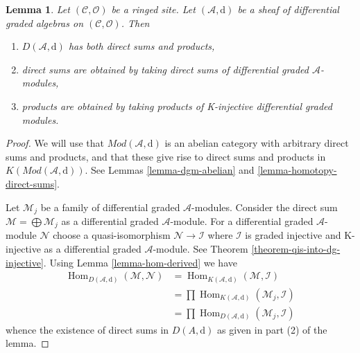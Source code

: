 \documentclass{stacks-project}
\theoremstyle{plain}
\newtheorem{lemma}[subsection]{Lemma}
\theoremstyle{definition}
\theoremstyle{remark}
\numberwithin{equation}{subsection}
\def\Hom{\mathop{\mathrm{Hom}}\nolimits}
\begin{document}
\begin{lemma}
\label{lemma-derived-products}
Let $(\mathcal{C}, \mathcal{O})$ be a ringed site. Let
$(\mathcal{A}, \text{d})$ be a sheaf of differential graded algebras
on $(\mathcal{C}, \mathcal{O})$. Then
\begin{enumerate}
\item $D(\mathcal{A}, \text{d})$ has both direct sums and products,
\item direct sums are obtained by taking direct sums of differential graded
$\mathcal{A}$-modules,
\item products are obtained by taking products of
K-injective differential graded modules.
\end{enumerate}
\end{lemma}

\begin{proof}
We will use that $\textit{Mod}(\mathcal{A}, \text{d})$ is an abelian category
with arbitrary direct sums and products, and that these give rise
to direct sums and products in $K(\textit{Mod}(\mathcal{A}, \text{d}))$.
See Lemmas \ref{lemma-dgm-abelian} and \ref{lemma-homotopy-direct-sums}.

\medskip\noindent
Let $\mathcal{M}_j$ be a family of differential graded $\mathcal{A}$-modules.
Consider the direct sum $\mathcal{M} = \bigoplus \mathcal{M}_j$
as a differential graded $\mathcal{A}$-module.
For a differential graded $\mathcal{A}$-module
$\mathcal{N}$ choose a quasi-isomorphism
$\mathcal{N} \to \mathcal{I}$ where
$\mathcal{I}$ is graded injective and K-injective as a
differential graded $\mathcal{A}$-module. See
Theorem \ref{theorem-qis-into-dg-injective}.
Using Lemma \ref{lemma-hom-derived} we have
\begin{align*}
\Hom_{D(\mathcal{A}, \text{d})}(\mathcal{M}, \mathcal{N})
& =
\Hom_{K(\mathcal{A}, \text{d})}(\mathcal{M}, \mathcal{I}) \\
& =
\prod \Hom_{K(\mathcal{A}, \text{d})}(\mathcal{M}_j, \mathcal{I}) \\
& =
\prod \Hom_{D(\mathcal{A}, \text{d})}(\mathcal{M}_j, \mathcal{I})
\end{align*}
whence the existence of direct sums in $D(A, \text{d})$ as given in
part (2) of the lemma.


\end{proof}
\end{document}
